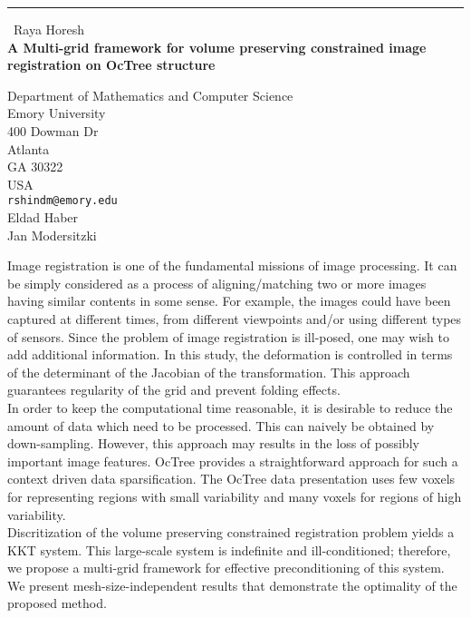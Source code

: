 \documentclass{report}
\begin{document}
\begin{center}
\rule{6in}{1pt} \
{\large Raya Horesh \\
{\bf A Multi-grid framework for volume preserving constrained image registration on OcTree structure}}

Department of Mathematics and Computer Science \\ Emory University \\ 400 Dowman Dr \\ Atlanta \\ GA 30322 \\ USA
\\
{\tt rshindm@emory.edu}\\
Eldad Haber\\
Jan Modersitzki\end{center}

Image registration is one of the fundamental missions of image
processing. It can be simply considered as a process of aligning/matching
two or more images having similar contents in some sense. For example,
the images could have been captured at different times, from different
viewpoints and/or using different types of sensors. Since the problem of
image registration is ill-posed, one may wish to add additional
information. In this study, the deformation is controlled in terms of the
determinant of the Jacobian of the transformation. This approach
guarantees regularity of the grid and prevent folding effects.\\

In order to keep the computational time reasonable, it is desirable to
reduce the amount of data which need to be processed. This can naively be
obtained by down-sampling. However, this approach may results in the loss
of possibly important image features. OcTree provides a straightforward
approach for such a context driven data sparsification. The OcTree data
presentation uses few voxels for representing regions with small
variability and many voxels for regions of high variability.\\

Discritization of the volume preserving constrained registration problem
yields a KKT system. This large-scale system is indefinite and
ill-conditioned; therefore, we propose a multi-grid framework for
effective preconditioning of this system. We present
mesh-size-independent results that demonstrate the optimality of the
proposed method.
\end{document}
